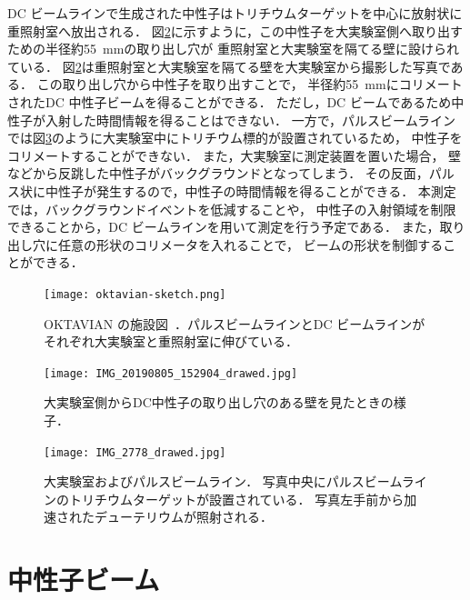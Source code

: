 \documentclass[../master]{subfiles}
\begin{document}
DC ビームラインで生成された中性子はトリチウムターゲットを中心に放射状に重照射室へ放出される．
図\ref{pic::hole}に示すように，この中性子を大実験室側へ取り出すための半径約\SI{55}{\milli\metre}の取り出し穴が
重照射室と大実験室を隔てる壁に設けられている．
図\ref{pic::hole}は重照射室と大実験室を隔てる壁を大実験室から撮影した写真である．
この取り出し穴から中性子を取り出すことで，
半径約\SI{55}{\milli\metre}にコリメートされたDC 中性子ビームを得ることができる．
ただし，DC ビームであるため中性子が入射した時間情報を得ることはできない．
一方で，パルスビームラインでは図\ref{pic::pulse_beam_line}のように大実験室中にトリチウム標的が設置されているため，
中性子をコリメートすることができない．
また，大実験室に測定装置を置いた場合，
壁などから反跳した中性子がバックグラウンドとなってしまう．
その反面，パルス状に中性子が発生するので，中性子の時間情報を得ることができる．
本測定では，バックグラウンドイベントを低減することや，
中性子の入射領域を制限できることから，DC ビームラインを用いて測定を行う予定である．
また，取り出し穴に任意の形状のコリメータを入れることで，
ビームの形状を制御することができる．
\begin{figure}
  \centering
  \texttt{[image: oktavian-sketch.png]}
  \caption[OKTAVIAN の施設図．]
          {OKTAVIAN の施設図~\cite{oktavian}．パルスビームラインとDC ビームラインがそれぞれ大実験室と重照射室に伸びている．}
  \label{pic::oktavian-sketch}
\end{figure}
\begin{figure}[h]
  \centering
  \texttt{[image: IMG\_20190805\_152904\_drawed.jpg]}
  \caption{大実験室側からDC中性子の取り出し穴のある壁を見たときの様子．}
  \label{pic::hole}
\end{figure}
\begin{figure}[h]
  \centering
  \texttt{[image: IMG\_2778\_drawed.jpg]}
  \caption[大実験室およびパルスビームライン．]
          {大実験室およびパルスビームライン．
            写真中央にパルスビームラインのトリチウムターゲットが設置されている．
          写真左手前から加速されたデューテリウムが照射される．}
  \label{pic::pulse_beam_line}
\end{figure}

\section{中性子ビーム}
\end{document}
